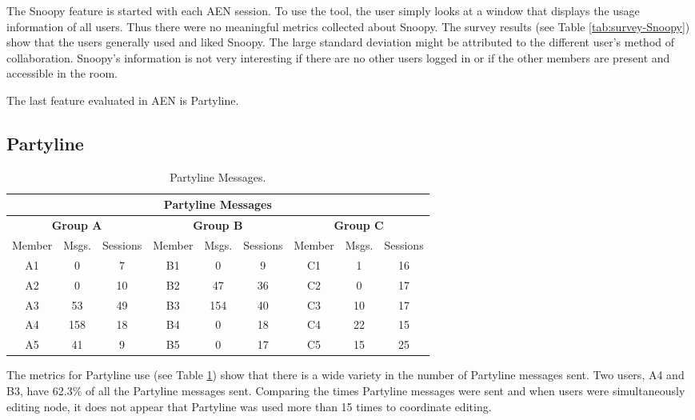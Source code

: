 The Snoopy feature is started with each AEN session.  To use the tool, the
user simply looks at a window that displays the usage information of all
users.  Thus there were no meaningful metrics collected about Snoopy.  The
survey results (see Table \ref{tab:survey-Snoopy}) show that the users
generally used and liked Snoopy.  The large standard deviation might be
attributed to the different user's method of collaboration.  Snoopy's
information is not very interesting if there are no other users logged in
or if the other members are present and accessible in the room.


The last feature evaluated in AEN is Partyline.
\subsection{Partyline} 

\footnotesize
\begin{table}[htbp]
  \caption{Partyline Messages.}
  \begin{center}
    \begin{tabular}{|c|c|c||c|c|c||c|c|c|}
      \hline
      \multicolumn{9}{|c|}{\rule[-3mm]{0mm}{8mm}\bf Partyline Messages}\\
      \hline
      \multicolumn{3}{|c||}{\rule[-3mm]{0mm}{8mm}\bf Group A}&
      \multicolumn{3}{|c||}{\rule[-3mm]{0mm}{8mm}\bf Group B}&
      \multicolumn{3}{|c|}{\rule[-3mm]{0mm}{8mm}\bf Group C}\\ \hline
      Member&Msgs.&Sessions&Member&Msgs.&Sessions&Member&Msgs.&Sessions\\ \hline
      \hline
      A1&0&7&B1&0&9&C1&1&16\\\hline 
      A2&0&10&B2&47&36&C2&0&17\\ \hline
      A3&53&49&B3&154&40&C3&10&17\\ \hline
      A4&158&18&B4&0&18&C4&22&15\\ \hline
      A5&41&9&B5&0&17&C5&15&25\\\hline
    \end{tabular}
  \end{center}
  \label{tab:A-Partyline}
\end{table}
\normalsize


The metrics for Partyline use (see Table \ref{tab:A-Partyline}) show
that there is a wide variety in the number of Partyline messages sent.
Two users, A4 and B3, have 62.3\% of all the Partyline messages
sent.  Comparing the times Partyline messages were sent and when users
were simultaneously editing node, it does not appear that Partyline was
used more than 15 times to coordinate editing.

